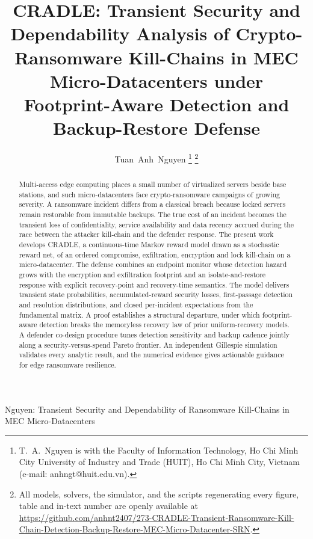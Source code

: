 \documentclass[journal]{IEEEtran}
\begin{document}
\title{CRADLE: Transient Security and Dependability Analysis of
Crypto-Ransomware Kill-Chains in MEC Micro-Datacenters under Footprint-Aware
Detection and Backup-Restore Defense}

\author{Tuan~Anh~Nguyen%
\thanks{T.~A.~Nguyen is with the Faculty of Information Technology, Ho Chi Minh
City University of Industry and Trade (HUIT), Ho Chi Minh City, Vietnam
(e-mail: anhngt@huit.edu.vn).}%
\thanks{All models, solvers, the simulator, and the scripts regenerating every
figure, table and in-text number are openly available at
\url{https://github.com/anhnt2407/273-CRADLE-Transient-Ransomware-Kill-Chain-Detection-Backup-Restore-MEC-Micro-Datacenter-SRN}.}}

%
{Nguyen: Transient Security and Dependability of Ransomware Kill-Chains in MEC Micro-Datacenters}

\maketitle

\begin{abstract}
Multi-access edge computing places a small number of virtualized servers beside
base stations, and such micro-datacenters face crypto-ransomware campaigns of
growing severity. A ransomware incident differs from a classical breach because
locked servers remain restorable from immutable backups. The true cost of an
incident becomes the transient loss of confidentiality, service availability and
data recency accrued during the race between the attacker kill-chain and the
defender response. The present work develops CRADLE, a continuous-time Markov
reward model drawn as a stochastic reward net, of an ordered compromise,
exfiltration, encryption and lock kill-chain on a micro-datacenter. The defense
combines an endpoint monitor whose detection hazard grows with the encryption
and exfiltration footprint and an isolate-and-restore response with explicit
recovery-point and recovery-time semantics. The model delivers transient state
probabilities, accumulated-reward security losses, first-passage detection and
resolution distributions, and closed per-incident expectations from the
fundamental matrix. A proof establishes a structural departure, under which
footprint-aware detection breaks the memoryless recovery law of prior
uniform-recovery models. A defender co-design procedure tunes detection
sensitivity and backup cadence jointly along a security-versus-spend Pareto
frontier. An independent Gillespie simulation validates every analytic result,
and the numerical evidence gives actionable guidance for edge ransomware
resilience.
\end{abstract}
\end{document}
